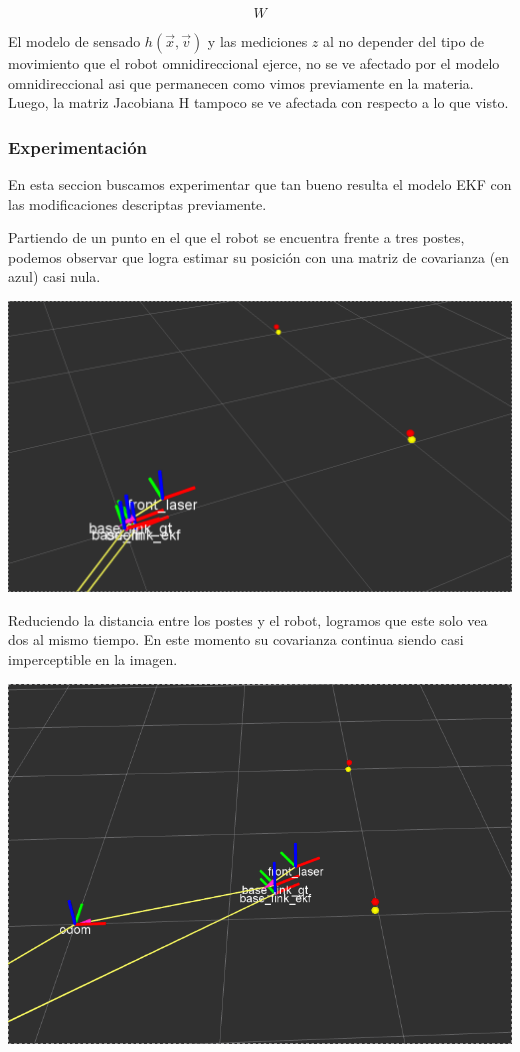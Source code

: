 $$W$$

El modelo de sensado $h(\overrightarrow{x},\overrightarrow{v})$ y las mediciones $z$ al no depender del tipo de movimiento que el robot omnidireccional ejerce, no se ve afectado por el modelo omnidireccional asi que permanecen como vimos previamente en la materia. Luego, la matriz Jacobiana H tampoco se ve afectada con respecto a lo que visto.


\subsubsection{Experimentación}

En esta seccion buscamos experimentar que tan bueno resulta el modelo EKF con las modificaciones descriptas previamente.

Partiendo de un punto en el que el robot se encuentra frente a tres postes, podemos observar que logra estimar su posición con una matriz de covarianza (en azul) casi nula.

\includegraphics[scale=0.3]{punto4/ekfViendoTodosLosPostes.png}

Reduciendo la distancia entre los postes y el robot, logramos que este solo vea dos al mismo tiempo. En este momento su covarianza continua siendo casi imperceptible en la imagen.

\includegraphics[scale=0.3]{punto4/ekfViendoDosPostes.png}

